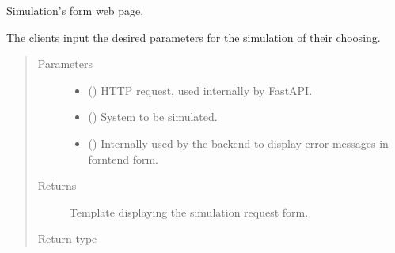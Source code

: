 \documentclass[a4paper,landscape,10pt,english]{sphinxmanual}
\begin{document}
\begin{fulllineitems}
\label{\detokenize{code_docs/simulation_api.controller:simulation_api.controller.main.simulate_sim_system}}
Simulation’s form web page.

The clients input the desired parameters for the simulation of their
choosing.
\begin{quote}\begin{description}
\item[{Parameters}] \leavevmode\begin{itemize}
\item {} 
 () \textendash{} HTTP request, used internally by FastAPI.

\item {} 
 ({\hyperref[\detokenize{code_docs/simulation_api.controller:simulation_api.controller.schemas.SimSystem}]{}}) \textendash{} System to be simulated.

\item {} 
 () \textendash{} Internally used by the backend to display error messages in forntend
form.

\end{itemize}

\item[{Returns}] \leavevmode
Template displaying the simulation request form.

\item[{Return type}] \leavevmode
{}

\end{description}\end{quote}

\end{fulllineitems}
\end{document}
